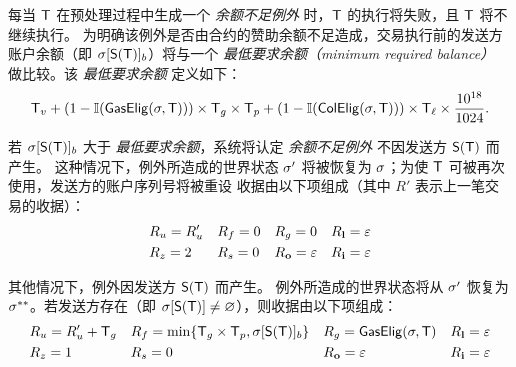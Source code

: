 每当 $\textsf{T}$ 在预处理过程中生成一个 \emph{余额不足例外} 时，$\textsf{T}$ 的执行将失败，且 $\textsf{T}$ 将不继续执行。
为明确该例外是否由合约的赞助余额不足造成，交易执行前的发送方账户余额（即 $\mathbf{\sigma}[\mathsf{S}{\left({\textsf{T}} \right)}]_b$）将与一个 \emph{最低要求余额（minimum required balance）} 做比较。该 \emph{最低要求余额} 定义如下： 
\begin{align}
	\textsf{T}_v+(1-\mathbb{I}(\mathsf{GasElig}(\mathbf{\sigma},\textsf{T})))\times \textsf{T}_g \times \textsf{T}_p + (1-\mathbb{I}(\mathsf{ColElig}(\mathbf{\sigma},\textsf{T})))\times \textsf{T}_\ell \times \frac{10^{18}}{1024}.
\end{align}

若 $\mathbf{\sigma}[\mathsf{S}{\left({\textsf{T}} \right)}]_b$ 大于 \emph{最低要求余额}，系统将认定 \emph{余额不足例外} 不因发送方 $\mathsf{S}{\left({\textsf{T}} \right)}$ 而产生。
这种情况下，例外所造成的世界状态 $\mathbf{\sigma}'$ 将被恢复为 $\mathbf{\sigma}$；为使 $\textsf{T}$ 可被再次使用，发送方的账户序列号将被重设
收据由以下项组成（其中 $R'$ 表示上一笔交易的收据）：
\begin{align}
	&R_u=R'_u && R_f=0 && R_g=0 && R_{\bf l}=\mathbb{\varepsilon} \\
	&R_z=2 && R_s=0 && R_{\bf o}=\mathbb{\varepsilon} && R_{\bf i}=\mathbb{\varepsilon}
\end{align}

其他情况下，例外因发送方 $\mathsf{S}{\left({\textsf{T}} \right)}$ 而产生。
例外所造成的世界状态将从 $\mathbf{\sigma}'$ 恢复为 $\mathbf{\sigma}^{**}$。若发送方存在（即 $\mathbf{\sigma}[\mathsf{S}{\left({\textsf{T}} \right)}]\neq\varnothing$），则收据由以下项组成：
\begin{align}
	&R_u=R'_u+\textsf{T}_g && R_f=\min\{\textsf{T}_g\times\textsf{T}_p,\mathbf{\sigma}[\mathsf{S}{\left({\textsf{T}} \right)}]_b\} && R_g=\mathsf{GasElig}(\mathbf{\sigma},\textsf{T}) && R_{\bf l}=\mathbb{\varepsilon} \\
	&R_z=1 && R_s=0 && R_{\bf o}=\mathbb{\varepsilon} && R_{\bf i}=\mathbb{\varepsilon}
\end{align}

